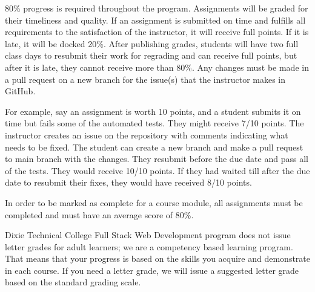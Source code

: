 80\% progress is required throughout the program. Assignments will be graded for their timeliness
and quality. If an assignment is submitted on time and fulfills all requirements to the satisfaction
of the instructor, it will receive full points. If it is late, it will be docked 20\%. After publishing
grades, students will have two full class days to resubmit their work for regrading and
can receive full points, but after it is late, they cannot receive more than 80\%. Any changes must
be made in a pull request on a new branch for the issue(s) that the instructor makes in GitHub.
\par
\bigskip
For example, say an assignment is worth 10 points, and a student submits it on time but fails some of the
automated tests. They might receive 7/10 points. The instructor creates an issue on the repository with
comments indicating what needs to be fixed. The student can create a new branch and make a pull request to
main branch with the changes. They resubmit before the due date and pass all of the tests. They would receive
10/10 points. If they had waited till after the due date to resubmit their fixes, they would have received 8/10 points.
\par
\bigskip
In order to be marked as complete for a course module, all assignments must be completed and must have an
average score of 80\%.
\par
\bigskip
Dixie Technical College Full Stack Web Development program does not issue letter grades for adult learners; we are
a competency based learning program. That means that your progress is based on the skills you acquire
and demonstrate in each course. If you need a letter grade, we will issue a suggested letter grade based
on the standard grading scale.
